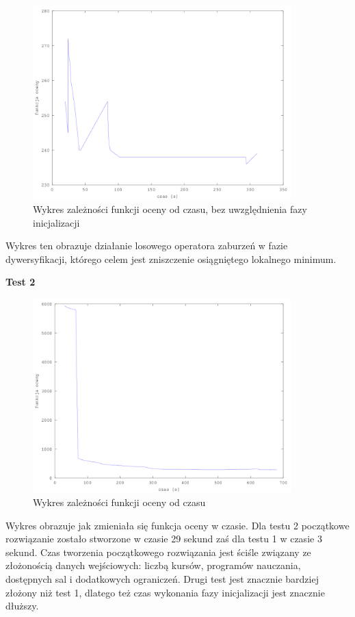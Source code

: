 \begin{figure}[H]
  
  \centering
    \includegraphics[width=10cm]{szczeg.png}
    \caption{Wykres zależności funkcji oceny od czasu, bez uwzględnienia fazy inicjalizacji}
\end{figure}
Wykres ten obrazuje działanie losowego operatora zaburzeń w fazie dywersyfikacji, którego celem jest zniszczenie osiągniętego lokalnego minimum.
\par \textbf{Test 2}
\begin{figure}[H]

  \centering
    \includegraphics[width=10cm]{ogolny2_instancja.png}
      \caption{Wykres zależności funkcji oceny od czasu}
\end{figure}
Wykres obrazuje jak zmieniała się funkcja oceny w czasie. Dla testu 2 początkowe rozwiązanie zostało stworzone w czasie 29 sekund zaś dla testu 1 w czasie 3 sekund. Czas tworzenia początkowego rozwiązania jest ściśle związany ze złożonością danych wejściowych: liczbą kursów, programów nauczania, dostępnych sal i dodatkowych ograniczeń. Drugi test jest znacznie bardziej złożony niż test 1, dlatego też czas wykonania fazy inicjalizacji jest znacznie dłuższy.
